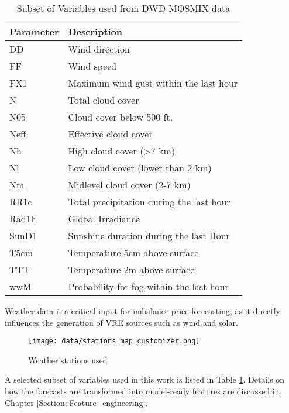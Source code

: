 \documentclass[class=scrbook, crop=false]{standalone}
\begin{document}
\begin{table}[h]
\centering
\begin{tabular}{l|l}
Parameter & Description \\\hline
DD & Wind direction\\
FF & Wind speed\\
FX1 & Maximum wind gust within the last hour\\
N & Total cloud cover\\
N05 & Cloud cover below 500 ft.\\
Neff & Effective cloud cover\\
Nh & High cloud cover (>7 km)\\
Nl & Low cloud cover (lower than 2 km)\\
Nm & Midlevel cloud cover (2-7 km)\\
RR1c & Total precipitation during the last hour\\
Rad1h & Global Irradiance\\
SunD1 & Sunshine duration during the last Hour\\
T5cm & Temperature 5cm above surface\\
TTT & Temperature 2m above surface\\
wwM & Probability for fog within the last hour\\
\end{tabular}
\caption{Subset of Variables used from DWD MOSMIX data}
\label{Table::DWD_MOSMIX_Parameters_Small}
\end{table}

Weather data is a critical input for imbalance price forecasting, as it directly influences the generation of \gls{VRE} sources such as wind and solar.

\begin{figure}[h]
            \centering
            \texttt{[image: data/stations\_map\_customizer.png]}
            \caption[Weather stations used]{Weather stations used}
            \label{fig::weather_stations}
 \end{figure}
A selected subset of variables used in this work is listed in Table \ref{Table::DWD_MOSMIX_Parameters_Small}. Details on how the forecasts are transformed into model-ready features are discussed in Chapter \ref{Section::Feature_engineering}.

\end{document}
